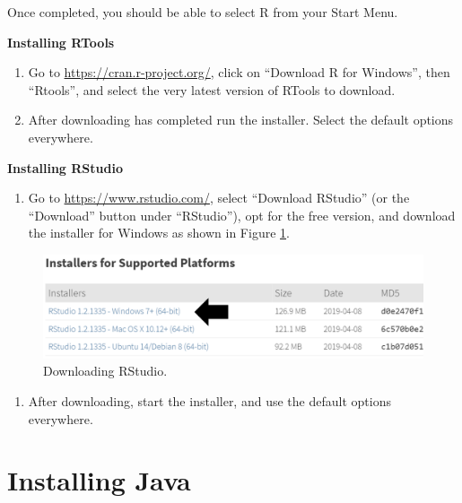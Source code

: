\documentclass[11pt]{book}
\providecommand{\tightlist}{%
  \setlength{\itemsep}{0pt}\setlength{\parskip}{0pt}}
\theoremstyle{definition}
\theoremstyle{definition}
\theoremstyle{definition}
\theoremstyle{remark}
\begin{document}
Once completed, you should be able to select R from your Start Menu.

\textbf{Installing RTools}

\begin{enumerate}
\def\labelenumi{\arabic{enumi}.}
\item
  Go to \url{https://cran.r-project.org/}, click on ``Download R for Windows'', then ``Rtools'', and select the very latest version of RTools to download.
\item
  After downloading has completed run the installer. Select the default options everywhere.
\end{enumerate}

\textbf{Installing RStudio}

\begin{enumerate}
\def\labelenumi{\arabic{enumi}.}
\tightlist
\item
  Go to \url{https://www.rstudio.com/}, select ``Download RStudio'' (or the ``Download'' button under ``RStudio''), opt for the free version, and download the installer for Windows as shown in Figure \ref{fig:downloadRStudio}.
\end{enumerate}

\begin{figure}

{\centering \includegraphics[width=1\linewidth]{images/OhdsiAnalyticsTools/downloadRStudio} 

}

\caption{Downloading RStudio.}\label{fig:downloadRStudio}
\end{figure}

\begin{enumerate}
\def\labelenumi{\arabic{enumi}.}
\setcounter{enumi}{1}
\tightlist
\item
  After downloading, start the installer, and use the default options everywhere.
\end{enumerate}

\hypertarget{installing-java}{%
\section{Installing Java}\label{installing-java}}
\end{document}
